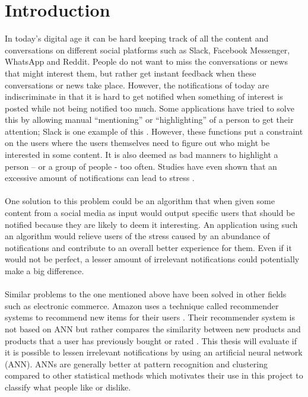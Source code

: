 \chapter{Introduction}\label{chap:intro}
In today’s digital age it can be hard keeping track of all the content and conversations on different social platforms such as Slack, Facebook Messenger, WhatsApp and Reddit. People do not want to miss the conversations or news that might interest them, but rather get instant feedback when these conversations or news take place. However, the notifications of today are indiscriminate in that it is hard to get notified when something of interest is posted while not being notified too much. Some applications have tried to solve this by allowing manual “mentioning” or “highlighting” of a person to get their attention; Slack is one example of this \parencite{slack}. However, these functions put a constraint on the users where the users themselves need to figure out who might be interested in some content. It is also deemed as bad manners to highlight a person -- or a group of people - too often. Studies have even shown that an excessive amount of notifications can lead to stress \parencite{relaffinity}.
\\\\
One solution to this problem could be an algorithm that when given some content from a social media as input would output specific users that should be notified because they are likely to deem it interesting. An application using such an algorithm would relieve users of the stress caused by an abundance of notifications and contribute to an overall better experience for them. Even if it would not be perfect, a lesser amount of irrelevant notifications could potentially make a big difference.
\\\\
Similar problems to the one mentioned above have been solved in other fields such as electronic commerce. Amazon uses a technique called recommender systems to recommend new items for their users \parencite{amazonfiltering}. Their recommender system is not based on ANN but rather compares the similarity between new products and products that a user has previously bought or rated \parencite{amazonfiltering}. This thesis will evaluate if it is possible to lessen irrelevant notifications by using an artificial neural network (ANN). ANNs are generally better at pattern recognition and clustering compared to other statistical methods \parencite{basheer2000artificial} which motivates their use in this project to classify what people like or dislike.

